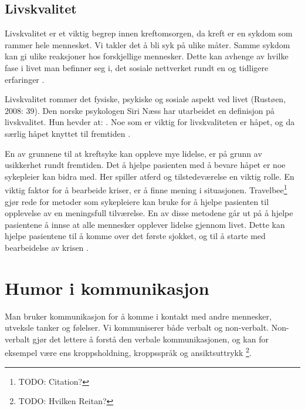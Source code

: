 \subsection{Livskvalitet}

Livskvalitet er et viktig begrep innen kreftomsorgen, da kreft er en sykdom som
rammer hele mennesket. Vi takler det å bli syk på ulike måter. Samme sykdom kan
gi ulike reaksjoner hos forskjellige mennesker. Dette kan avhenge av hvilke
fase i livet man befinner seg i, det sosiale nettverket rundt en og tidligere
erfaringer \cite[s.~39]{rustoen2008}.

Livskvalitet rommer det fysiske, psykiske og sosiale aspekt ved livet (Rustøen,
2008: 39). Den norske psykologen Siri Næss har utarbeidet en definisjon på
livskvalitet. Hun hevder at: . Noe som er viktig for livskvaliteten
er håpet, og da særlig håpet knyttet til fremtiden \cite[s.~40]{rustoen2008}.

En av grunnene til at kreftsyke kan oppleve mye lidelse, er på grunn av
usikkerhet rundt fremtiden. Det å hjelpe pasienten med å bevare håpet er noe
sykepleier kan bidra med. Her spiller atferd og tilstedeværelse en viktig
rolle. En viktig faktor for å bearbeide kriser, er å finne mening i
situasjonen. Travelbee\footnote{TODO: Citation?} gjør rede for metoder som
sykepleiere kan bruke for å hjelpe pasienten til opplevelse av en meningsfull
tilværelse. En av disse metodene går ut på å hjelpe pasientene å innse at alle
mennesker opplever lidelse gjennom livet. Dette kan hjelpe pasientene til å
komme over det første sjokket, og til å starte med bearbeidelse av krisen
\cite[s.~40--42]{rustoen2008}.

\section{Humor i kommunikasjon}

Man bruker kommunikasjon for å komme i kontakt med andre mennesker, utveksle
tanker og følelser. Vi kommuniserer både verbalt og non-verbalt. Non-verbalt
gjør det lettere å forstå den verbale kommunikasjonen, og kan for eksempel være
ens kroppsholdning, kroppsspråk og ansiktsuttrykk
\cite[s.~65--67]{reitan2008.kommunikasjon}\footnote{TODO: Hvilken Reitan?}.

